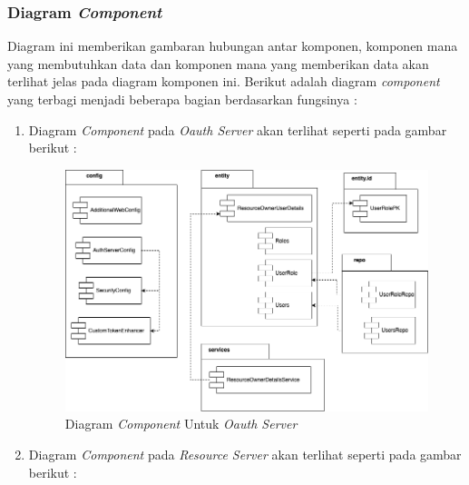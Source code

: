 \documentclass[pdftex,12pt, oneside]{article}
\begin{document}
\subsubsection{Diagram \textit{Component}}


Diagram ini memberikan gambaran hubungan antar komponen, komponen mana yang membutuhkan data dan komponen mana yang memberikan data akan terlihat jelas pada diagram komponen ini. Berikut adalah diagram \textit{component} yang terbagi menjadi beberapa bagian berdasarkan fungsinya :

\begin{enumerate}
	\item Diagram \textit{Component} pada \textit{Oauth Server} akan terlihat seperti pada gambar berikut :
	
	\begin{figure}[H]
		\centering
		\includegraphics[width=1\textwidth]{./resources/comp-dia-oauth}
		\caption{Diagram \textit{Component} Untuk \textit{Oauth Server}}
		\label{fig:comp-dia-oauth}
	\end{figure}
	
	\item Diagram \textit{Component} pada \textit{Resource Server} akan terlihat seperti pada gambar berikut :
	

\end{enumerate}
\end{document}
